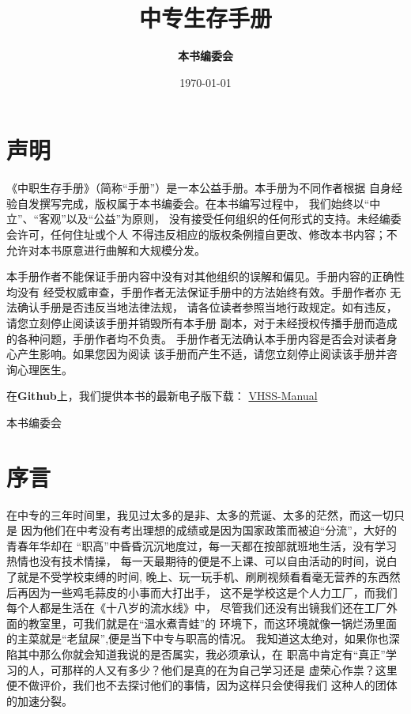 \documentclass{article}
\begin{document}
\title{\textbf{中专生存手册}}
\author{\textbf{本书编委会}}
\date{\today{}}

\maketitle
\thispagestyle{empty}
\newpage

\section*{声明}

《中职生存手册》（简称“手册”）是一本公益手册。本手册为不同作者根据
自身经验自发撰写完成，版权属于本书编委会。在本书编写过程中，
我们始终以“中立”、“客观”以及“公益”为原则，
没有接受任何组织的任何形式的支持。未经编委会许可，任何住址或个人
不得违反相应的版权条例擅自更改、修改本书内容；不允许对本书原意进行曲解和大规模分发。

本手册作者不能保证手册内容中没有对其他组织的误解和偏见。手册内容的正确性均没有
经受权威审查，手册作者无法保证手册中的方法始终有效。手册作者亦
无法确认手册是否违反当地法律法规，
请各位读者参照当地行政规定。如有违反，请您立刻停止阅读该手册并销毁所有本手册
副本，对于未经授权传播手册而造成的各种问题，手册作者均不负责。
手册作者无法确认本手册内容是否会对读者身心产生影响。如果您因为阅读
该手册而产生不适，请您立刻停止阅读该手册并咨询心理医生。

在\textbf{Github}上，我们提供本书的最新电子版下载：
\href{https://github.com/VHS-Survival-Manual/VHSS-Manual}{VHSS-Manual}

\begin{flushright}
本书编委会
\end{flushright}

\newpage
\section*{序言}

在中专的三年时间里，我见过太多的是非、太多的荒诞、太多的茫然，而这一切只是
因为他们在中考没有考出理想的成绩或是因为国家政策而被迫“分流”，大好的青春年华却在
“职高”中昏昏沉沉地度过，每一天都在按部就班地生活，没有学习热情也没有技术情操，
每一天最期待的便是不上课、可以自由活动的时间，说白了就是不受学校束缚的时间,
晚上、玩一玩手机、刷刷视频看看毫无营养的东西然后再因为一些鸡毛蒜皮的小事而大打出手，
这不是学校这是个人力工厂，而我们每个人都是生活在《十八岁的流水线》中，
尽管我们还没有出镜我们还在工厂外面的教室里，可我们就是在“温水煮青蛙”的
环境下，而这环境就像一锅烂汤里面的主菜就是“老鼠屎”,便是当下中专与职高的情况。
我知道这太绝对，如果你也深陷其中那么你就会知道我说的是否属实，我必须承认，在
职高中肯定有“真正”学习的人，可那样的人又有多少？他们是真的在为自己学习还是
虚荣心作祟？这里便不做评价，我们也不去探讨他们的事情，因为这样只会使得我们
这种人的团体的加速分裂。
\end{document}
